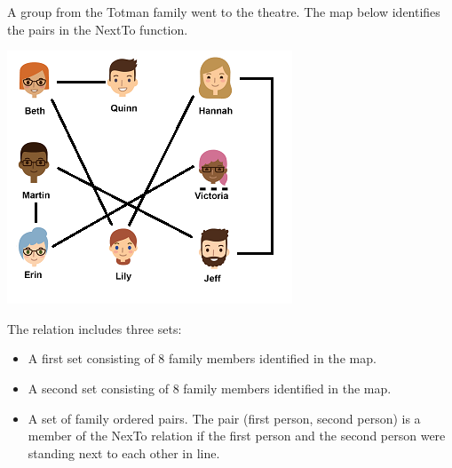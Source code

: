 \documentclass{ximera}
\begin{document}
\begin{exercise}
  A group from the Totman family went to the theatre. The map below identifies the pairs in the NextTo function.
  
  

    \includegraphics[width=321px,height=285px]{pics/standinline.png}

  
 
  \begin{definition}
  The  relation includes three sets:
    \begin{itemize}
    \item A first set consisting of 8 family members identified in the map.
    \item A second set consisting of 8 family members identified in the map.
    \item A set of family ordered pairs. The pair (first person, second person) is a member of the NexTo relation if the first person and the second person were standing next to each other in line.
    \end{itemize}
  \end{definition}
  
\end{exercise}
\end{document}
